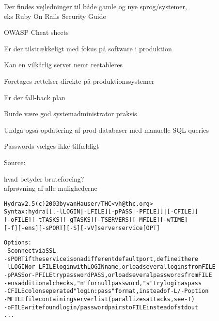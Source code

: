 \documentclass[Screen16to9,17pt]{foils}
\begin{document}
\begin{list2}
\begin{list2}
\item Der findes vejledninger til både gamle og nye sprog/systemer, \\
eks Ruby On Rails Security Guide\\

\item OWASP Cheat sheets\\
\end{list2}




\begin{list1}
\item Er der tilstrækkeligt med fokus på software i produktion
\item Kan en vilkårlig server nemt reetableres
\item Foretages rettelser direkte på produktionssystemer
\item Er der fall-back plan
\item Burde være god systemadministrator praksis
\vskip 2cm
\item Undgå også opdatering af prod databaser med manuelle SQL queries
\end{list1}




Passwords vælges ikke tilfældigt


Source:


\begin{list1}
\item hvad betyder bruteforcing?\\
afprøvning af alle mulighederne
\end{list1}

\begin{alltt}\footnotesize
Hydra v2.5 (c) 2003 by van Hauser / THC <vh@thc.org>
Syntax: hydra [[[-l LOGIN|-L FILE] [-p PASS|-P FILE]] | [-C FILE]]
[-o FILE] [-t TASKS] [-g TASKS] [-T SERVERS] [-M FILE] [-w TIME]
[-f] [-e ns] [-s PORT] [-S] [-vV] server service [OPT]

Options:
  -S        connect via SSL
  -s PORT   if the service is on a different default port, define it here
  -l LOGIN  or -L FILE login with LOGIN name, or load several logins from FILE
  -p PASS   or -P FILE try password PASS, or load several passwords from FILE
  -e ns     additional checks, "n" for null password, "s" try login as pass
  -C FILE   colon seperated "login:pass" format, instead of -L/-P option
  -M FILE   file containing server list (parallizes attacks, see -T)
  -o FILE   write found login/password pairs to FILE instead of stdout
...
\end{alltt}





\end{list2}
\end{document}
